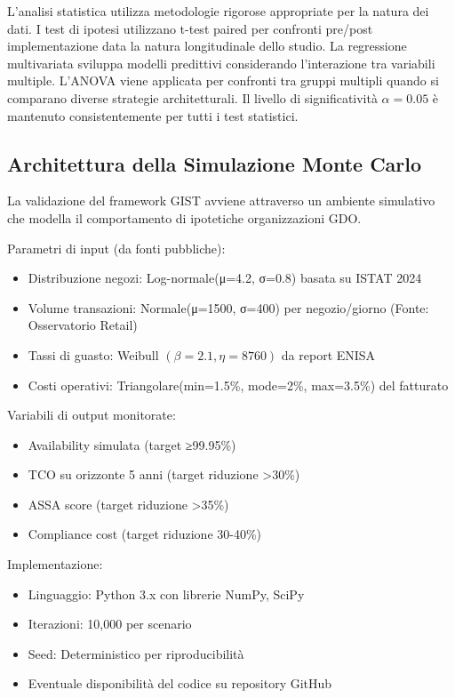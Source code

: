 \documentclass[12pt,a4paper,oneside]{book}
\numberwithin{figure}{chapter} %
\numberwithin{table}{chapter}  %
\begin{document}
L'analisi statistica utilizza metodologie rigorose appropriate per la
natura dei dati. I test di ipotesi utilizzano t-test paired per
confronti pre/post implementazione data la natura longitudinale dello
studio. La regressione multivariata sviluppa modelli predittivi
considerando l'interazione tra variabili multiple. 
L'ANOVA viene applicata per confronti tra gruppi multipli quando si comparano diverse
strategie architetturali. Il livello di significatività $\alpha = 0.05$ è
mantenuto consistentemente per tutti i test statistici.

\subsection{\texorpdfstring{\textbf{Architettura della Simulazione Monte Carlo}}{1.5.4 Architettura della Simulazione Monte Carlo}}\label{architettura-simulazione-montecarlo}

La validazione del framework GIST avviene attraverso un ambiente simulativo 
che modella il comportamento di ipotetiche organizzazioni GDO.

Parametri di input (da fonti pubbliche):
\begin{itemize}
    \item 
    Distribuzione negozi: Log-normale(μ=4.2, σ=0.8) basata su ISTAT 2024
     \item 
     Volume transazioni: Normale(μ=1500, σ=400) per negozio/giorno (Fonte: Osservatorio Retail)
     \item 
     Tassi di guasto: Weibull $(\beta=2.1, \eta=8760)$ da report ENISA
     \item 
    Costi operativi: Triangolare(min=1.5\%, mode=2\%, max=3.5\%) del fatturato
\end{itemize}

Variabili di output monitorate:
\begin{itemize}
    \item 
     Availability simulata (target ≥99.95\%)
    \item 
     TCO su orizzonte 5 anni (target riduzione >30\%)
    \item 
     ASSA score (target riduzione >35\%)
    \item 
     Compliance cost (target riduzione 30-40\%)
\end{itemize}

Implementazione:
\begin{itemize}
    \item 
     Linguaggio: Python 3.x con librerie NumPy, SciPy
    \item
     Iterazioni: 10,000 per scenario
    \item
     Seed: Deterministico per riproducibilità
    \item
     Eventuale disponibilità del codice su repository GitHub 
\end{itemize}
\end{document}
